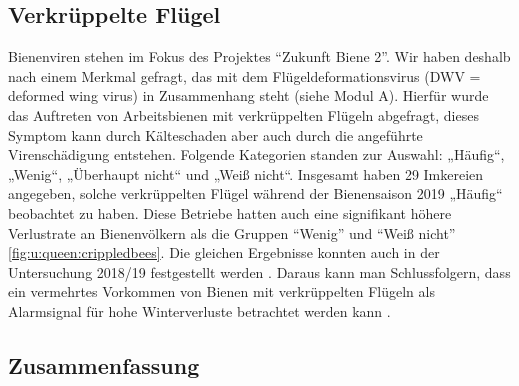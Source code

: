 \subsection{Verkrüppelte Flügel}

Bienenviren stehen im Fokus des Projektes \enquote{Zukunft Biene 2}. Wir haben deshalb nach einem Merkmal gefragt,
das mit dem Flügeldeformationsvirus (DWV = deformed wing virus) in Zusammenhang steht (siehe Modul A). Hierfür wurde das Auftreten von Arbeitsbienen mit verkrüppelten Flügeln abgefragt, dieses Symptom kann durch Kälteschaden aber auch durch die angeführte Virenschädigung entstehen. Folgende Kategorien standen zur Auswahl: „Häufig``, „Wenig``, „Überhaupt nicht`` und „Weiß nicht``. 
\newline
Insgesamt haben 29 Imkereien angegeben, solche verkrüppelten Flügel während der Bienensaison 2019 „Häufig`` beobachtet zu haben. Diese Betriebe hatten auch eine signifikant höhere Verlustrate an Bienenvölkern als  die Gruppen \enquote{Wenig} und \enquote{Weiß nicht} \cref{fig:u:queen:crippledbees}. Die gleichen Ergebnisse konnten auch in der Untersuchung 2018/19 festgestellt werden \citep{oberreiter2020}. Daraus kann man Schlussfolgern, dass ein vermehrtes Vorkommen von Bienen mit verkrüppelten Flügeln als Alarmsignal für hohe Winterverluste betrachtet werden kann \citep{morawetz2019}.

\subsection{Zusammenfassung}

